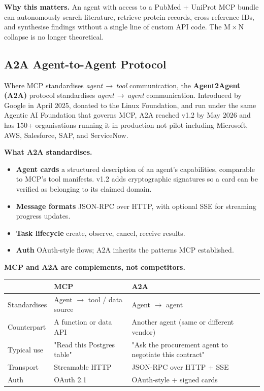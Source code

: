 \documentclass[a4paper,11pt]{article}
\begin{document}
\begin{ambercallout}
\textbf{Why this matters.}
An agent with access to a PubMed + UniProt MCP bundle can autonomously
search literature, retrieve protein records, cross-reference IDs, and
synthesise findings without a single line of custom API code. The
M\,$\times$\,N collapse is no longer theoretical.
\end{ambercallout}

\subsection{A2A \textemdash{} Agent-to-Agent Protocol}

Where MCP standardises \textit{agent\,$\to$\,tool} communication, the
\textbf{Agent2Agent (A2A)} protocol standardises
\textit{agent\,$\to$\,agent} communication. Introduced by Google in
April 2025, donated to the Linux Foundation, and run under the same
Agentic AI Foundation that governs MCP, A2A reached v1.2 by May 2026
and has 150+ organisations running it in production
\textemdash{} not pilot \textemdash{} including Microsoft, AWS,
Salesforce, SAP, and ServiceNow.

\textbf{What A2A standardises.}
\begin{itemize}[noitemsep, leftmargin=1.2em]
  \item \textbf{Agent cards} \textemdash{} a structured description
        of an agent's capabilities, comparable to MCP's tool
        manifests. v1.2 adds cryptographic signatures so a card can
        be verified as belonging to its claimed domain.
  \item \textbf{Message formats} \textemdash{} JSON-RPC over HTTP,
        with optional SSE for streaming progress updates.
  \item \textbf{Task lifecycle} \textemdash{} create, observe, cancel,
        receive results.
  \item \textbf{Auth} \textemdash{} OAuth-style flows; A2A inherits
        the patterns MCP established.
\end{itemize}

\textbf{MCP and A2A are complements, not competitors.}

\begin{center}\small
\begin{tabular}{p{3cm} p{4.5cm} p{4.5cm}}
  \toprule
   & \textbf{MCP} & \textbf{A2A} \\
  \midrule
  Standardises & Agent $\to$ tool / data source & Agent $\to$ agent \\
  Counterpart  & A function or data API         & Another agent (same or different vendor) \\
  Typical use  &  "Read this Postgres table"    & "Ask the procurement agent to negotiate this contract" \\
  Transport    & Streamable HTTP                  & JSON-RPC over HTTP + SSE \\
  Auth         & OAuth 2.1                       & OAuth-style + signed cards \\
  \bottomrule
\end{tabular}
\end{center}
\end{document}
